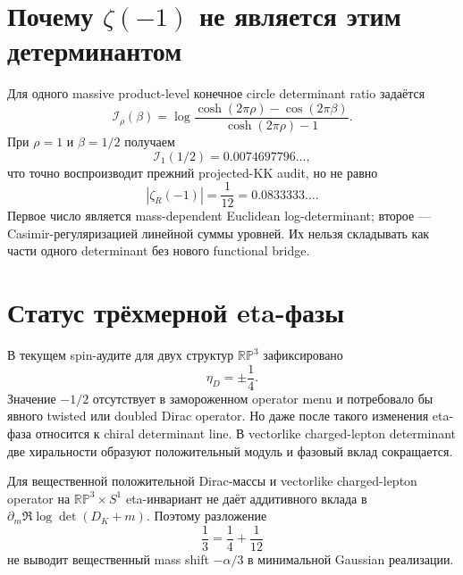 \section{Почему \texorpdfstring{\(\zeta(-1)\)}{zeta(-1)} не является этим
детерминантом}

Для одного massive product-level конечное circle determinant ratio задаётся
\begin{equation}
 \mathcal I_\rho(\beta)=
 \log\frac{\cosh(2\pi\rho)-\cos(2\pi\beta)}
 {\cosh(2\pi\rho)-1}.
\end{equation}
При \(\rho=1\) и \(\beta=1/2\) получаем
\begin{equation}
 \mathcal I_1(1/2)=0.0074697796\ldots,
\end{equation}
что точно воспроизводит прежний projected-KK audit, но не равно
\begin{equation}
 |\zeta_R(-1)|=\frac1{12}=0.0833333\ldots.
\end{equation}
Первое число является mass-dependent Euclidean log-determinant; второе ---
Casimir-регуляризацией линейной суммы уровней. Их нельзя складывать как
части одного determinant без нового functional bridge.

\section{Статус трёхмерной eta-фазы}

В текущем spin-аудите для двух структур \(\mathbb{RP}^3\) зафиксировано
\begin{equation}
 \eta_D=\pm\frac14.
\end{equation}
Значение \(-1/2\) отсутствует в замороженном operator menu и потребовало бы
явного twisted или doubled Dirac operator. Но даже после такого изменения
eta-фаза относится к chiral determinant line. В vectorlike charged-lepton
determinant две хиральности образуют положительный модуль и фазовый вклад
сокращается.

\begin{theorem}
Для вещественной положительной Dirac-массы и vectorlike charged-lepton
operator на \(\mathbb{RP}^3\times S^1\) eta-инвариант не даёт аддитивного
вклада в \(\partial_m\Re\log\det(D_K+m)\). Поэтому разложение
\begin{equation}
 \frac13=\frac14+\frac1{12}
\end{equation}
не выводит вещественный mass shift \(-\alpha/3\) в минимальной Gaussian
реализации.
\end{theorem}

